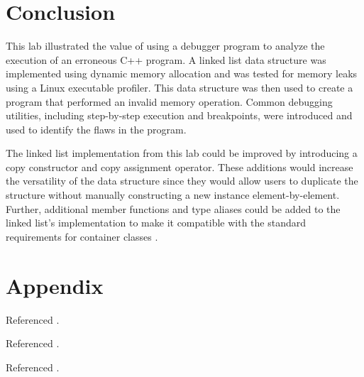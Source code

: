 \documentclass[11pt, letterpaper]{article} %
\begin{document}
\section*{Conclusion}

This lab illustrated the value of using a debugger program to analyze the execution of an erroneous C++ program. A linked list data structure was implemented using dynamic memory allocation and was tested for memory leaks using a Linux executable profiler. This data structure was then used to create a program that performed an invalid memory operation.  Common debugging utilities, including step-by-step execution and breakpoints, were introduced and used to identify the flaws in the program.


The linked list implementation from this lab could be improved by introducing a copy constructor and copy assignment operator. These additions would increase the versatility of the data structure since they would allow users to duplicate the structure without manually constructing a new instance element-by-element. Further, additional member functions and type aliases could be added to the linked list's implementation to make it compatible with the standard requirements for container classes \cite[\S26.2.1]{open-std-N4659}.



\clearpage
\section*{Appendix}
\renewcommand{\thelstlisting}{A.\arabic{lstlisting}}




Referenced \cite{cppreference-std-find-if,cppreference-advance,cppreference-multiset,cppreference-pointer,cppreference-less}.

Referenced \cite{rust-too-many-lists,cppreference-unique-ptr,cppreference-forward-list,cppreference-forward-itr,so-deprecate-std-iterator,cppreference-iterator-traits,cppreference-rule-of-three,cppreference-exchange,stroustrup-c++-core-guidelines}.

Referenced \cite{cppreference-exchange,stroustrup-c++-core-guidelines}.





\clearpage



\end{document}

